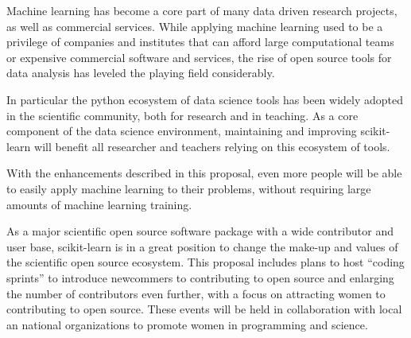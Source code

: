 Machine learning has become a core part of many data driven research projects,
as well as commercial services. While applying machine learning used to be
a privilege of companies and institutes that can afford large computational
teams or expensive commercial software and services, the rise of open
source tools for data analysis has leveled the playing field considerably.

In particular the python ecosystem of data science tools has been widely
adopted in the scientific community, both for research and in teaching.
As a core component of the data science environment, maintaining and
improving scikit-learn will benefit all researcher and teachers relying
on this ecosystem of tools.

With the enhancements described in this proposal, even more people
will be able to easily apply machine learning to their problems,
without requiring large amounts of machine learning training.

As a major scientific open source software package with a wide contributor
and user base, scikit-learn is in a great position to change
the make-up and values of the scientific open source ecosystem.
This proposal includes plans to host ``coding sprints'' to introduce
newcommers to contributing to open source and enlarging the
number of contributors even further, with a focus on attracting
women to contributing to open source. These events will be held
in collaboration with local an national organizations to promote
women in programming and science.


